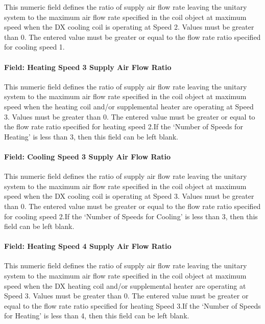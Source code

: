 This numeric field defines the ratio of supply air flow rate leaving the unitary system to the maximum air flow rate specified in the coil object at maximum speed when the DX cooling coil is operating at Speed 2. Values must be greater than 0. The entered value must be greater or equal to the flow rate ratio specified for cooling speed 1.

\paragraph{Field: Heating Speed 3 Supply Air Flow Ratio}\label{field-heating-speed-3-supply-air-flow-ratio}

This numeric field defines the ratio of supply air flow rate leaving the unitary system to the maximum air flow rate specified in the coil object at maximum speed when the heating coil and/or supplemental heater are operating at Speed 3. Values must be greater than 0. The entered value must be greater or equal to the flow rate ratio specified for heating speed 2.If the `Number of Speeds for Heating' is less than 3, then this field can be left blank.

\paragraph{Field: Cooling Speed 3 Supply Air Flow Ratio}\label{field-cooling-speed-3-supply-air-flow-ratio}

This numeric field defines the ratio of supply air flow rate leaving the unitary system to the maximum air flow rate specified in the coil object at maximum speed when the DX cooling coil is operating at Speed 3. Values must be greater than 0. The entered value must be greater or equal to the flow rate ratio specified for cooling speed 2.If the `Number of Speeds for Cooling' is less than 3, then this field can be left blank.

\paragraph{Field: Heating Speed 4 Supply Air Flow Ratio}\label{field-heating-speed-4-supply-air-flow-ratio}

This numeric field defines the ratio of supply air flow rate leaving the unitary system to the maximum air flow rate specified in the coil object at maximum speed when the DX heating coil and/or supplemental heater are operating at Speed 3. Values must be greater than 0. The entered value must be greater or equal to the flow rate ratio specified for heating Speed 3.If the `Number of Speeds for Heating' is less than 4, then this field can be left blank.

